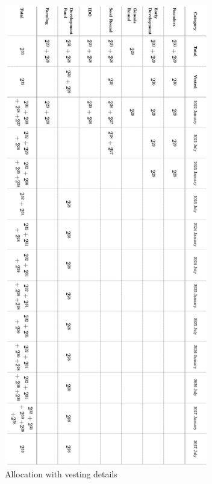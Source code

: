 \documentclass[12pt]{article}
\begin{document}
\begin{figure}[H]
\centering
  \includegraphics[width=3.5in]{images/The_Unit_Allocation_Table.png}
  \caption{Allocation with vesting details}
  \label{fig:allocation_table}
\end{figure}
\end{document}
